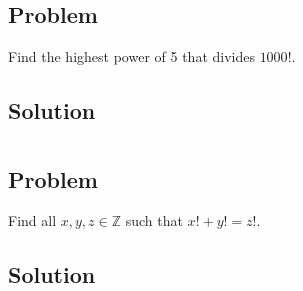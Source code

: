 \documentclass[12pt]{article}
\begin{document}
\section{}

\subsection{Problem}
Find the highest power of 5 that divides $1000!$.

\subsection{Solution}



\section{}

\subsection{Problem}
Find all $x, y, z \in \mathbb{Z}$ such that $x! + y! = z!$.

\subsection{Solution}
\end{document}
